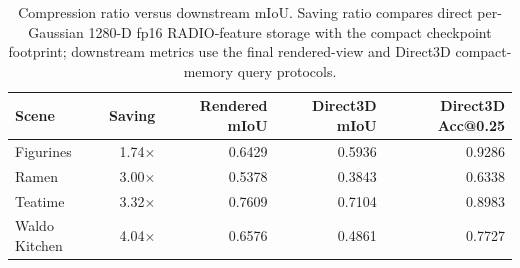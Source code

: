 \begin{table}[t]
\centering
\caption{Compression ratio versus downstream mIoU. Saving ratio compares direct per-Gaussian 1280-D fp16 RADIO-feature storage with the compact checkpoint footprint; downstream metrics use the final rendered-view and Direct3D compact-memory query protocols.}
\label{tab:compression_downstream_correlation}
\begin{tabular}{lrrrr}
\toprule
Scene & Saving & Rendered mIoU & Direct3D mIoU & Direct3D Acc@0.25 \\
\midrule
Figurines & 1.74$\times$ & 0.6429 & 0.5936 & 0.9286 \\
Ramen & 3.00$\times$ & 0.5378 & 0.3843 & 0.6338 \\
Teatime & 3.32$\times$ & 0.7609 & 0.7104 & 0.8983 \\
Waldo Kitchen & 4.04$\times$ & 0.6576 & 0.4861 & 0.7727 \\
\bottomrule
\end{tabular}
\end{table}
